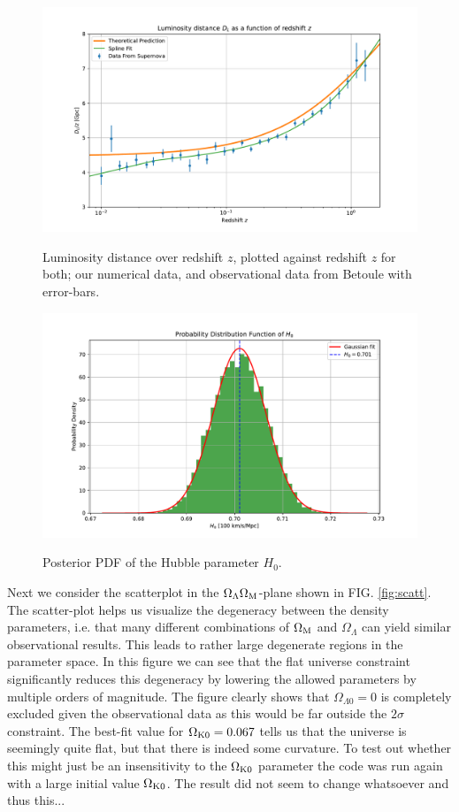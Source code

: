\documentclass[%
reprint,
 amsmath,amssymb,
 aps,
]{revtex4-2}
\begin{document}
\begin{figure}[ht!]
	\caption{Luminosity distance over redshift $z$, plotted against redshift $z$ for both; our numerical data, and observational data from Betoule \cite{SDSS:2014iwm} with error-bars.}
	\includegraphics[width = \linewidth]{Figures/LumiDistance.pdf}
	\label{fig:LumiDistance}
\end{figure}
\begin{figure}[ht!]
\caption{Posterior PDF of the Hubble parameter $H_0$.}
\includegraphics[width = \linewidth]{Figures/PDEh.pdf}
\label{fig:PDEh}
\end{figure}

Next we consider the scatterplot in the $\Omega_\Lambda\Omega_\text M$-plane shown in FIG. \ref{fig:scatt}. The scatter-plot helps us visualize the degeneracy between the density parameters, i.e. that many different combinations of $\Omega_\text M$ and $\Omega_{\Lambda}$ can yield similar observational results. This leads to rather large degenerate regions in the parameter space. In this figure we can see that the flat universe constraint significantly reduces this degeneracy by lowering the allowed parameters by multiple orders of magnitude. The figure clearly shows that $\Omega_{\Lambda0}=0$ is completely excluded given the observational data as this would be far outside the $2\sigma$ constraint. The best-fit value for $\Omega_{\text K0}=0.067$ tells us that the universe is seemingly quite flat, but that there is indeed some curvature. To test out whether this might just be an insensitivity to the $\Omega_{\text K0}$ parameter the code was run again with a large initial value $\Omega_{\text K0}$. The result did not seem to change whatsoever and thus this...
\end{document}
